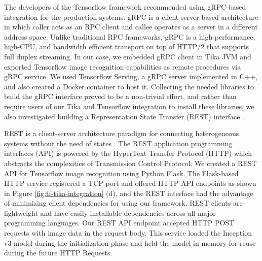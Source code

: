 The developers of the Tensorflow framework recommended using gRPC-based integration for the production systems\cite{goog-tfserve}. gRPC is a client-server based architecture in which caller acts as an RPC client and callee operates as a server in a different address space. Unlike traditional RPC frameworks, gRPC is a high-performance, high-CPU, and bandwidth efficient transport on top of HTTP/2 that supports full duplex streaming\cite{about-grpc}. In our case, we embedded gRPC client in Tika JVM and exported Tensorflow image recognition capabilities as remote procedures via gRPC service. We used Tensorflow Serving, a gRPC server implemented in C++, and also created a Docker container to host it.  Collecting the needed libraries to build the gRPC interface proved to be a non-trivial effort, and rather than require users of our Tika and Tensorflow integration to install these libraries, we also investigated building a Representation State Transfer (REST) interface \cite{Fielding:2000:ASD:932295}.

REST is a client-server architecture paradigm for connecting heterogeneous systems without the need of states \cite[Chapter~5]{Fielding:2000:ASD:932295}. The REST application programming interfaces (API) is powered by the HyperText Transfer Protocol (HTTP) which abstracts the complexities of Transmission Control Protocol.
We created a REST API for Tensorflow image recognition using Python Flask. The Flask-based HTTP service registered a TCP port and offered HTTP API endpoints as shown in Figure \ref{fig:tf-tika-integration} (d), and the REST interface had the advantage of minimizing client dependencies for using our framework. REST clients are lightweight and have easily installable dependencies across all major programming languages. Our REST API endpoint accepted HTTP POST requests with image data in the request body. This service loaded the Inception v3 \cite{SzegedyVISW15} model during the initialization phase and held the model in memory for reuse during the future HTTP Requests.



